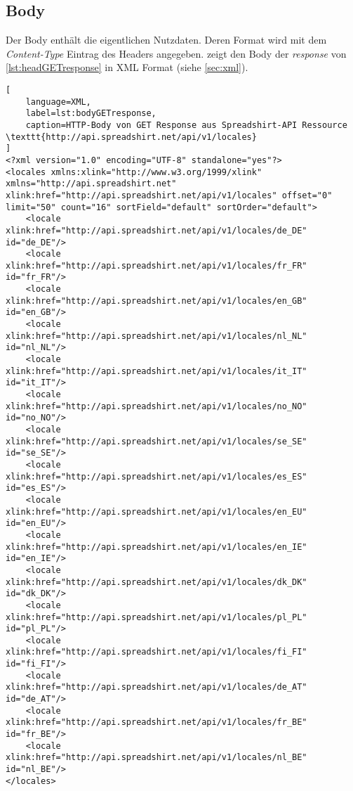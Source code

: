 \subsection{Body}
\label{sec:http-body}

Der Body enthält die eigentlichen Nutzdaten. Deren Format wird mit dem \emph{Content-Type} Eintrag des Headers angegeben.  zeigt den Body der \emph{response} von \cref{lst:headGETresponse} in \gls{XML} Format (siehe \cref{sec:xml}).

\begin{lstlisting}[
    language=XML,
    label=lst:bodyGETresponse,
    caption=HTTP-Body von GET Response aus Spreadshirt-API Ressource \texttt{http://api.spreadshirt.net/api/v1/locales}
]
<?xml version="1.0" encoding="UTF-8" standalone="yes"?>
<locales xmlns:xlink="http://www.w3.org/1999/xlink" xmlns="http://api.spreadshirt.net" xlink:href="http://api.spreadshirt.net/api/v1/locales" offset="0" limit="50" count="16" sortField="default" sortOrder="default">
    <locale xlink:href="http://api.spreadshirt.net/api/v1/locales/de_DE" id="de_DE"/>
    <locale xlink:href="http://api.spreadshirt.net/api/v1/locales/fr_FR" id="fr_FR"/>
    <locale xlink:href="http://api.spreadshirt.net/api/v1/locales/en_GB" id="en_GB"/>
    <locale xlink:href="http://api.spreadshirt.net/api/v1/locales/nl_NL" id="nl_NL"/>
    <locale xlink:href="http://api.spreadshirt.net/api/v1/locales/it_IT" id="it_IT"/>
    <locale xlink:href="http://api.spreadshirt.net/api/v1/locales/no_NO" id="no_NO"/>
    <locale xlink:href="http://api.spreadshirt.net/api/v1/locales/se_SE" id="se_SE"/>
    <locale xlink:href="http://api.spreadshirt.net/api/v1/locales/es_ES" id="es_ES"/>
    <locale xlink:href="http://api.spreadshirt.net/api/v1/locales/en_EU" id="en_EU"/>
    <locale xlink:href="http://api.spreadshirt.net/api/v1/locales/en_IE" id="en_IE"/>
    <locale xlink:href="http://api.spreadshirt.net/api/v1/locales/dk_DK" id="dk_DK"/>
    <locale xlink:href="http://api.spreadshirt.net/api/v1/locales/pl_PL" id="pl_PL"/>
    <locale xlink:href="http://api.spreadshirt.net/api/v1/locales/fi_FI" id="fi_FI"/>
    <locale xlink:href="http://api.spreadshirt.net/api/v1/locales/de_AT" id="de_AT"/>
    <locale xlink:href="http://api.spreadshirt.net/api/v1/locales/fr_BE" id="fr_BE"/>
    <locale xlink:href="http://api.spreadshirt.net/api/v1/locales/nl_BE" id="nl_BE"/>
</locales>
\end{lstlisting}

